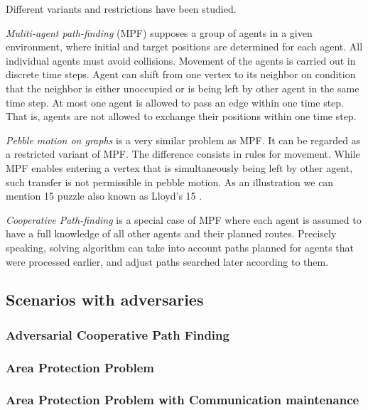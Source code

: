 Different variants and restrictions have been studied.

\emph{Muliti-agent path-finding} (MPF) \cite{source1}  supposes a group of agents in a given
environment, where initial and target positions are determined for each agent.
All individual agents must avoid collisions. Movement of the agents is carried
out in discrete time steps. Agent can shift from one vertex to its neighbor on
condition that the neighbor is either unoccupied or is being left by other agent
in the same time step. At most one agent is allowed to pass an edge within one
time step. That is, agents are not allowed to exchange their positions within one
time step.

\emph{Pebble motion on graphs} \cite{source1,source2} is a very similar problem as MPF. It can
be regarded as a restricted variant of MPF. The difference consists in rules for
movement. While MPF enables entering a vertex that is simultaneously being
left by other agent, such transfer is not permissible in pebble motion. As an
illustration we can mention 15 puzzle also known as Lloyd’s 15 \cite{lloydXX}.

\emph{Cooperative Path-finding} \cite{cpf} is a special case of MPF where each agent is
assumed to have a full knowledge of all other agents and their planned routes.
Precisely speaking, solving algorithm can take into account paths planned for
agents that were processed earlier, and adjust paths searched later according to
them.

\subsection{Scenarios with adversaries}

\subsubsection{Adversarial Cooperative Path Finding}

\subsubsection{Area Protection Problem}

\subsubsection{Area Protection Problem with Communication maintenance}

